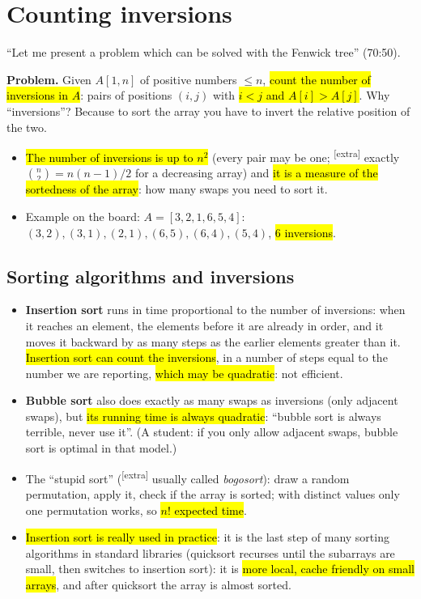 \documentclass[11pt,a4paper]{article}
\theoremstyle{definition}\newtheorem*{definition}{Definition}
\newcommand{\hly}[1]{{\sethlcolor{hlY}\hl{#1}}}
\newcommand{\hlg}[1]{{\sethlcolor{hlG}\hl{#1}}}
\newcommand{\hlp}[1]{{\sethlcolor{hlP}\hl{#1}}}
\newcommand{\hlb}[1]{{\sethlcolor{hlB}\hl{#1}}}
\newcommand{\extra}{\textsuperscript{\textcolor{warn}{[extra]}}}
\begin{document}
\section{Counting inversions}
``Let me present a problem which can be solved with the Fenwick tree'' (70:50).

\noindent\textbf{Problem.} Given $A[1,n]$ of positive numbers $\le n$, \hlb{count the number of inversions in \mbox{$A$}}: pairs of positions $(i,j)$ with
\hlb{\mbox{$i<j$} and \mbox{$A[i]>A[j]$}}. Why ``inversions''? Because to sort the array you have to invert the relative position of the two.
\begin{itemize}[nosep]
\item \hly{The number of inversions is up to \mbox{$n^2$}} (every pair may be one; \extra{} exactly $\binom n2=n(n-1)/2$ for a decreasing array) and
      \hlb{it is a measure of the sortedness of the array}: how many swaps you need to sort it.
\item Example on the board: $A=[3,2,1,6,5,4]$: $(3,2),(3,1),(2,1),(6,5),(6,4),(5,4)$, \hlb{6 inversions}.
\end{itemize}

\subsection{Sorting algorithms and inversions}
\begin{itemize}
\item \textbf{Insertion sort} runs in time proportional to the number of inversions: when it reaches an element, the elements before it are already in order,
      and it moves it backward by as many steps as the earlier elements greater than it. \hly{Insertion sort can count the inversions},
      in a number of steps equal to the number we are reporting, \hlp{which may be quadratic}: not efficient.
\item \textbf{Bubble sort} also does exactly as many swaps as inversions (only adjacent swaps), but \hlp{its running time is always quadratic}:
      ``bubble sort is always terrible, never use it''. (A student: if you only allow adjacent swaps, bubble sort is optimal in that model.)
\item The ``stupid sort'' (\extra{} usually called \emph{bogosort}): draw a random permutation, apply it, check if the array is sorted; with distinct values only one
      permutation works, so \hlp{\mbox{$n!$} expected time}.
\item \hlg{Insertion sort is really used in practice}: it is the last step of many sorting algorithms in standard libraries (quicksort recurses until the subarrays are small,
      then switches to insertion sort): it is \hlg{more local, cache friendly on small arrays}, and after quicksort the array is almost sorted.
\end{itemize}
\end{document}
